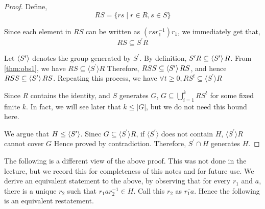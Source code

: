 \begin{proof}

Define, 
$$RS = \lbrace rs \mid r \in R, s \in S \rbrace$$

Since each element in $RS$ can be written as $(r s r_1^{-1}) r_1$, we immediately get that,
\begin{equation}
RS \subseteq S^\prime R
\label{thm:obs1}
\end{equation}

Let $\left\langle S^\prime \right\rangle$ denotes the group generated by $S^\prime$. By definition, $S^\prime R \subseteq \left\langle S^\prime \right\rangle R$. From \ref{thm:obs1}, we have $RS \subseteq \langle S^\prime \rangle R$
Therefore, $RSS \subseteq \left\langle S^\prime \right\rangle RS$, and hence $RSS \subseteq \left\langle S^\prime \right\rangle RS$. Repeating this process, we have
$\forall t \geq 0, RS^t \subseteq \langle S^\prime \rangle R$

Since $R$ contains the identity, and $S$ generates $G$, $G \subseteq \bigcup\limits_{i=1}^k RS^t$ for some fixed finite $k$. In fact, we will see later that $k \le |G|$, but we do not need this bound here.

We argue that $H \le \left\langle S^\prime \right\rangle$. Sinec $G \subseteq \langle S^\prime \rangle R$, if $\langle S^\prime \rangle$ does not contain $H$, $\langle S^\prime \rangle R $ cannot cover $G$ Hence proved by contradiction. Therefore, $S^\prime \cap H$ generates $H$.
\end{proof}

The following is a different view of the above proof. This was not done in the lecture, but we record this for completeness of this notes and for future use. We derive an equivalent statement to the above, by observing that for every $r_1$ and $a$, there is a unique $r_2$ such that $r_1ar_2^{-1} \in H$. Call this $r_2$ as $\overline{r_1a}$. Hence the following is an equivalent restatement.


